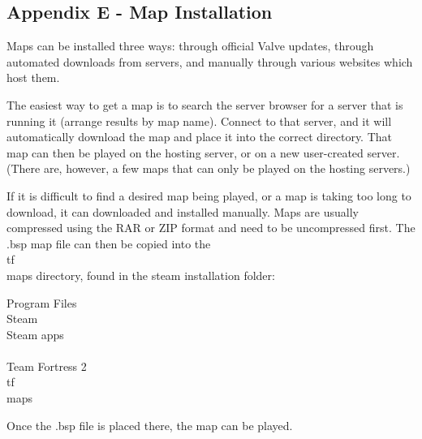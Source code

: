 \subsection{Appendix E - Map Installation}
Maps can be installed three ways: through official Valve updates, through automated downloads from servers, and manually through various websites which host them.  

The easiest way to get a map is to search the server browser for a server that is running it (arrange results by map name). Connect to that server, and it will automatically download the map and place it into the correct directory. That map can then be played on the hosting server, or on a new user-created server.  (There are, however, a few maps that can only be played on the hosting servers.)

If it is difficult to find a desired map being played, or a map is taking too long to download, it can downloaded and installed manually. Maps are usually compressed using the RAR or ZIP format and need to be uncompressed first.  The .bsp map file can then be copied into the \\tf\\maps directory, found in the steam installation folder:

Program Files\\Steam\\Steam apps\\<user name>\\Team Fortress 2\\tf\\maps

Once the .bsp file is placed there, the map can be played.